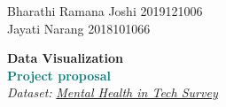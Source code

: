 \documentclass[titlepage, 12pt]{article}
\begin{document}
\begin{titlepage}

	\raggedleft

	\vspace*{\baselineskip}

	{Bharathi Ramana Joshi 2019121006\\Jayati Narang 2018101066}

	\vspace*{0.167\textheight}

	\textbf{\LARGE Data Visualization}\\[\baselineskip]

	\textbf{\textcolor{teal}{\huge Project proposal}}\\[\baselineskip]

    {\Large \textit{Dataset:
    }\href{https://www.kaggle.com/osmi/mental-health-in-tech-survey}{\textit{Mental
    Health in Tech Survey}}}

	\raggedright

    \tableofcontents

\end{titlepage}

\newpage
\end{document}
